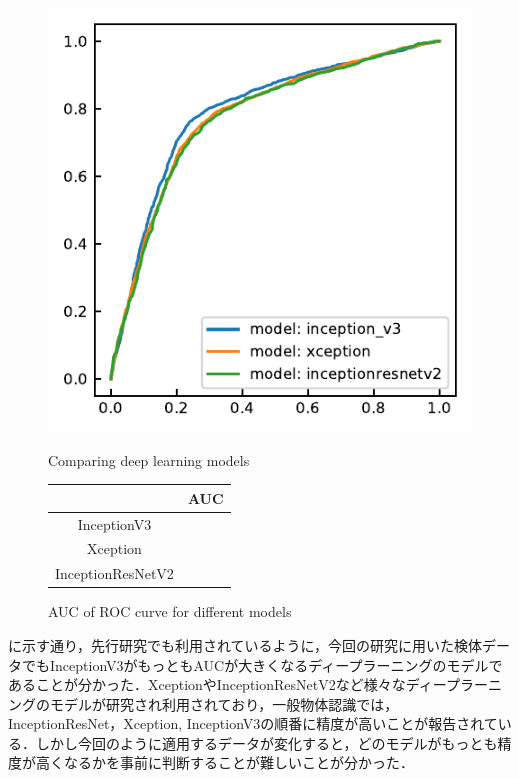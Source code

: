 \begin{figure}[H]
	\centering
	\begin{minipage}{0.4\columnwidth}
		\centering
		\includegraphics[width=\linewidth]{fig/chapter4/2dcnn_model}
		\caption{Comparing deep learning models}
		\label{fig:2dcnnmodel}
	\end{minipage}
	\makeatletter
	\def\@captype{table}
	\makeatother
	\begin{minipage}{0.4\columnwidth}
		\centering
		\caption{AUC of ROC curve for different models}
		\label{tab:2DCNNcompare_AUC}
		\begin{tabular}{cc}\toprule
			& AUC \\ \midrule
			InceptionV3 &  \\ 
			Xception &  \\ 
			InceptionResNetV2 &  \\ \bottomrule
		\end{tabular} 
	\end{minipage}
\end{figure}

に示す通り，先行研究でも利用されているように，今回の研究に用いた検体データでもInceptionV3がもっともAUCが大きくなるディープラーニングのモデルであることが分かった．XceptionやInceptionResNetV2など様々なディープラーニングのモデルが研究され利用されており，一般物体認識では，InceptionResNet，Xception, InceptionV3の順番に精度が高いことが報告されている．しかし今回のように適用するデータが変化すると，どのモデルがもっとも精度が高くなるかを事前に判断することが難しいことが分かった．


